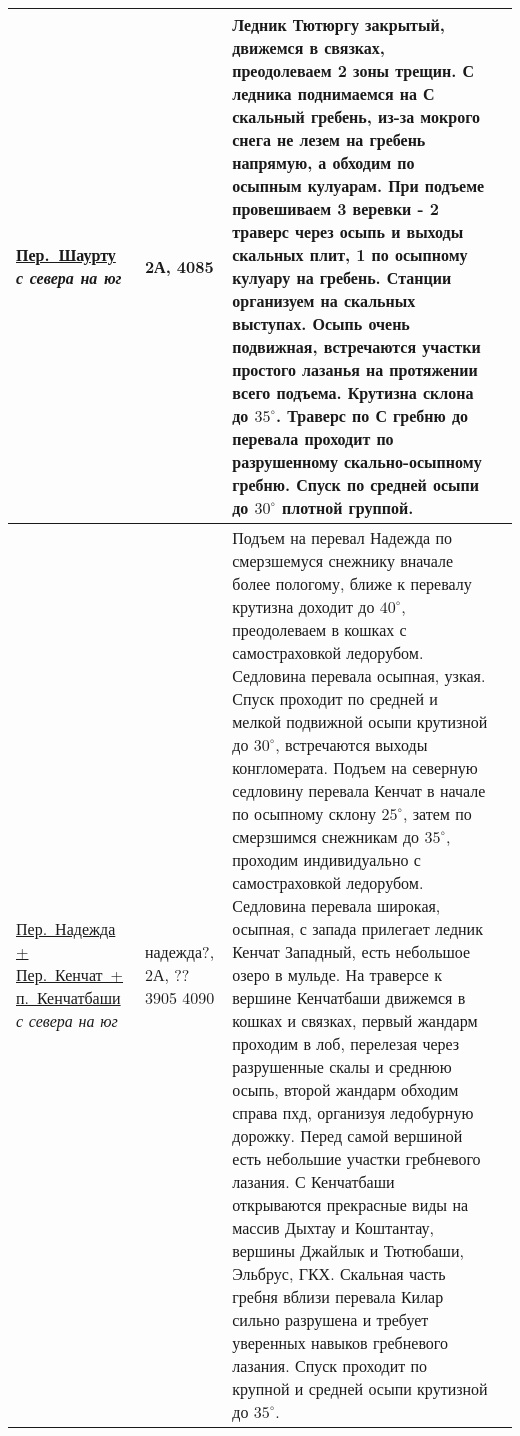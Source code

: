 \begin{longtable}{|>{\centering\arraybackslash}m{4.5cm}|>{\centering\arraybackslash}m{1.8cm}|>{\raggedright\arraybackslash}m{9.6cm}|>{\centering\arraybackslash}m{1.2cm}|}
			\hyperref[subsec:main_obstacles]{{\small Пер.~Шаурту}}																\newline\textit{с севера на юг}			&	2А,	4085		&	{\small Ледник Тютюргу закрытый, движемся в связках, преодолеваем 2 зоны трещин. С ледника поднимаемся на С скальный гребень, из-за мокрого снега не лезем на гребень напрямую, а обходим по осыпным кулуарам. При подъеме провешиваем 3 веревки - 2 траверс через осыпь и выходы скальных плит, 1 по осыпному кулуару на гребень. Станции организуем на скальных выступах. Осыпь очень подвижная, встречаются участки простого лазанья на протяжении всего подъема. Крутизна склона до $35^\circ$. Траверс по С гребню до перевала проходит по разрушенному скально-осыпному гребню. Спуск по средней осыпи до $30^\circ$ плотной группой.}							&		\\ \hline
			\hyperref[subsec:main_obstacles]{{\small Пер.~Надежда + Пер.~Кенчат~+ п.~Кенчатбаши}}																\newline\textit{с севера на юг}			&	надежда?, 2А, ?? 3905 4090		&	{\small Подъем на перевал Надежда по смерзшемуся снежнику вначале более пологому, ближе к перевалу крутизна доходит до $40^\circ$, преодолеваем в кошках с самостраховкой ледорубом. Седловина перевала осыпная, узкая. Спуск проходит по средней и мелкой подвижной осыпи крутизной до $30^\circ$, встречаются выходы конгломерата. Подъем на северную седловину перевала Кенчат в начале по осыпному склону $25^\circ$, затем по смерзшимся снежникам до $35^\circ$, проходим индивидуально с самостраховкой ледорубом. Седловина перевала широкая, осыпная, с запада прилегает ледник Кенчат Западный, есть небольшое озеро в мульде. На траверсе к вершине Кенчатбаши движемся в кошках и связках, первый жандарм проходим в лоб, перелезая через разрушенные скалы и среднюю осыпь, второй жандарм обходим справа пхд, организуя ледобурную дорожку. Перед самой вершиной есть небольшие участки гребневого лазания. С Кенчатбаши открываются прекрасные виды на массив Дыхтау и Коштантау, вершины Джайлык и Тютюбаши, Эльбрус, ГКХ. Скальная часть гребня вблизи перевала Килар сильно разрушена и требует уверенных навыков гребневого лазания. Спуск проходит по крупной и средней осыпи крутизной до $35^\circ$.}							&		\\ \hline


\end{longtable}
